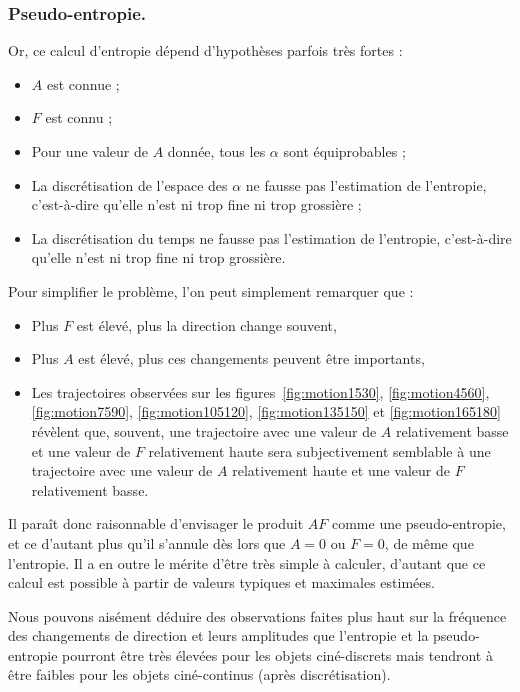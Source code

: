 	\FloatBarrier \subsubsection{Pseudo-entropie.}
	Or, ce calcul d'entropie dépend d'hypothèses parfois très fortes :
	
	\begin{itemize}
		\item $A$ est connue ;
		\item $F$ est connu ;
		\item Pour une valeur de $A$ donnée, tous les $\alpha$ sont équiprobables ;
		\item La discrétisation de l'espace des $\alpha$ ne fausse pas l'estimation de l'entropie, c'est-à-dire qu'elle n'est ni trop fine ni trop grossière ;
		\item La discrétisation du temps ne fausse pas l'estimation de l'entropie, c'est-à-dire qu'elle n'est ni trop fine ni trop grossière.
	\end{itemize}
	
	Pour simplifier le problème, l'on peut simplement remarquer que :
	\begin{itemize}
		\item Plus $F$ est élevé, plus la direction change souvent,
		\item Plus $A$ est élevé, plus ces changements peuvent être importants,
		\item Les trajectoires observées sur les figures~\ref{fig:motion1530}, \ref{fig:motion4560}, \ref{fig:motion7590}, \ref{fig:motion105120}, \ref{fig:motion135150} et \ref{fig:motion165180} révèlent que, souvent, une trajectoire avec une valeur de $A$ relativement basse et une valeur de $F$ relativement haute sera subjectivement semblable à une trajectoire avec une valeur de $A$ relativement haute et une valeur de $F$ relativement basse.
	\end{itemize}
	
	Il paraît donc raisonnable d'envisager le produit $AF$ comme une pseudo-entropie, et ce d'autant plus qu'il s'annule dès lors que $A=0$ ou $F=0$, de même que l'entropie. Il a en outre le mérite d'être très simple à calculer, d'autant que ce calcul est possible à partir de valeurs typiques et maximales estimées.
	
	Nous pouvons aisément déduire des observations faites plus haut sur la fréquence des changements de direction et leurs amplitudes que l'entropie et la pseudo-entropie pourront être très élevées pour les objets ciné-discrets mais tendront à être faibles pour les objets ciné-continus (après discrétisation).
	
